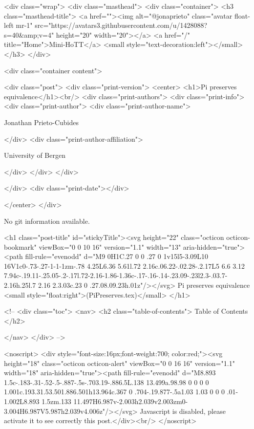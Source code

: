    <div class="wrap">
      <div class="masthead">
        <div class="container">
          <h3 class="masthead-title">
            <a href=""><img alt="@jonaprieto" class="avatar float-left mr-1" src="https://avatars3.githubusercontent.com/u/1428088?s=40&amp;v=4" height="20" width="20"></a>
            <a href="/" title="Home">Mini-HoTT</a>
            <small style="text-decoration:left"></small>
          </h3>
        </div>
      
      <div class="container content">
        







<div class="post">
  <div class="print-version">
    <center>
      <h1>Pi preserves equivalence</h1><br/>
        <div class="print-authors">
          <div class="print-info">
            <div class="print-author">
              <div class="print-author-name">
                
                  Jonathan Prieto-Cubides
                
              </div>
              <div class="print-author-affiliation">
                
                  University of Bergen
                
                </div>
            </div>
          </div>
          
          
        </div>
        <div class="print-date"></div>
        
        
    </center>
  </div>

  
  No git information available.
  

  <h1 class="post-title" id="stickyTitle"><svg height="22" class="octicon octicon-bookmark" viewBox="0 0 10 16" version="1.1" width="13" aria-hidden="true"><path fill-rule="evenodd" d="M9 0H1C.27 0 0 .27 0 1v15l5-3.09L10 16V1c0-.73-.27-1-1-1zm-.78 4.25L6.36 5.61l.72 2.16c.06.22-.02.28-.2.17L5 6.6 3.12 7.94c-.19.11-.25.05-.2-.17l.72-2.16-1.86-1.36c-.17-.16-.14-.23.09-.23l2.3-.03.7-2.16h.25l.7 2.16 2.3.03c.23 0 .27.08.09.23h.01z"/></svg> Pi preserves equivalence <small style="float:right">(PiPreserves.tex)</small>
  </h1>

  <!-- 
  <div class="toc">
    <nav>
    <h2 class="table-of-contents"> Table of Contents </h2>
      

    </nav>
  </div>
   -->

  <noscript>
  <div style="font-size:16px;font-weight:700; color:red;"><svg height="18" class="octicon octicon-alert" viewBox="0 0 16 16" version="1.1" width="18" aria-hidden="true"><path fill-rule="evenodd" d="M8.893 1.5c-.183-.31-.52-.5-.887-.5s-.703.19-.886.5L.138 13.499a.98.98 0 0 0 0 1.001c.193.31.53.501.886.501h13.964c.367 0 .704-.19.877-.5a1.03 1.03 0 0 0 .01-1.002L8.893 1.5zm.133 11.497H6.987v-2.003h2.039v2.003zm0-3.004H6.987V5.987h2.039v4.006z"/></svg> Javascript is disabled, please activate it to see correctly this post.</div><br/>
  </noscript>

